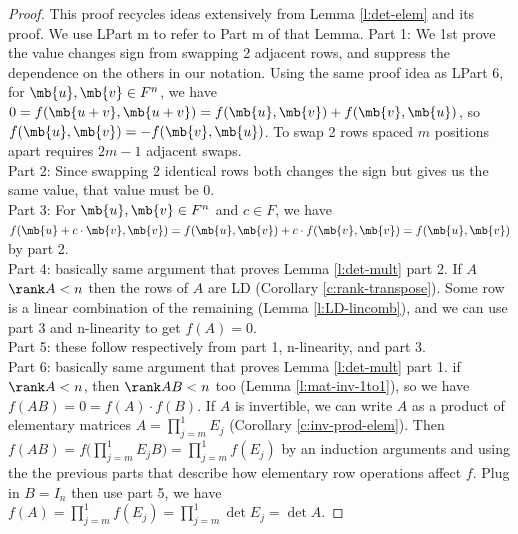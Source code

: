 \begin{proof}%
This proof recycles ideas extensively from Lemma \ref{l:det-elem} and its proof. We use LPart m to refer to Part m of that Lemma.
Part 1: We 1st prove the value changes sign from swapping 2 adjacent rows, and suppress the dependence on the others in our notation.
Using the same proof idea as LPart 6, for $\mb{u}, \mb{v}\in F^n$, we have $0=f(\mb{u+v}, \mb{u+v})=f(\mb{u}, \mb{v})+f(\mb{v}, \mb{u})$, so $f(\mb{u}, \mb{v})=-f(\mb{v}, \mb{u})$.
To swap 2 rows spaced $m$ positions apart requires $2m-1$ adjacent swaps.\\
Part 2: Since swapping 2 identical rows both changes the sign but gives us the same value, that value must be 0.\\
Part 3: For $\mb{u}, \mb{v}\in F^n$ and $c \in F$, we have $f(\mb{u}+ c \cdot \mb{v}, \mb{v})=f(\mb{u}, \mb{v})+c \cdot f(\mb{v}, \mb{v})=f(\mb{u}, \mb{v})$ by part 2.\\
Part 4: basically same argument that proves Lemma \ref{l:det-mult} part 2. If $A$ $\rank A<n$ then the rows of $A$ are LD (Corollary \ref{c:rank-transpose}). Some row is a linear combination of the remaining (Lemma \ref{l:LD-lincomb}), and we can use part 3 and n-linearity to get $f(A)=0$.\\
Part 5: these follow respectively from part 1, n-linearity, and part 3.\\
Part 6: basically same argument that proves Lemma \ref{l:det-mult} part 1. if $\rank A<n$, then $\rank AB<n$ too (Lemma \ref{l:mat-inv-1to1}), so we have $f(AB)=0=f(A) \cdot f(B)$.
If $A$ is invertible, we can write $A$ as a product of elementary matrices $A= \prod_{j=m}^1E_j$ (Corollary \ref{c:inv-prod-elem}).
Then $f(AB)=f \big( \prod_{j=m}^1E_jB \big)= \prod_{j=m}^1f(E_j)$ by an induction arguments and using the the previous parts that describe how elementary row operations affect $f$.
Plug in $B=I_n$ then use part 5, we have $f(A)= \prod_{j=m}^1f(E_j)= \prod_{j=m}^1 \det E_j= \det A$.
\end{proof}